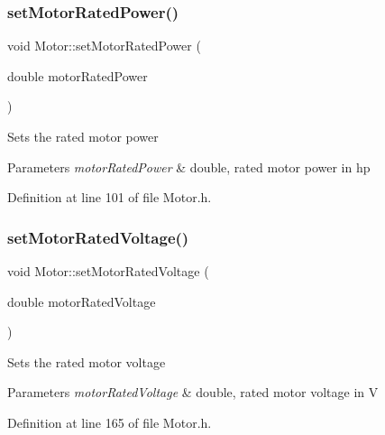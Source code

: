 \mbox{\label{class_motor_aa01f82db13c71b045b05e49f42ba46e9}} 
\subsubsection{\texorpdfstring{set\+Motor\+Rated\+Power()}{setMotorRatedPower()}}
{\footnotesize\ttfamily void Motor\+::set\+Motor\+Rated\+Power (\begin{DoxyParamCaption}\item[{double}]{motor\+Rated\+Power }\end{DoxyParamCaption})\hspace{0.3cm}{\ttfamily [inline]}}

Sets the rated motor power 
\begin{DoxyParams}{Parameters}
{\em motor\+Rated\+Power} & double, rated motor power in hp \\
\hline
\end{DoxyParams}


Definition at line 101 of file Motor.\+h.

\mbox{\label{class_motor_aab754019236e34cba0acd3632567515e}} 
\subsubsection{\texorpdfstring{set\+Motor\+Rated\+Voltage()}{setMotorRatedVoltage()}}
{\footnotesize\ttfamily void Motor\+::set\+Motor\+Rated\+Voltage (\begin{DoxyParamCaption}\item[{double}]{motor\+Rated\+Voltage }\end{DoxyParamCaption})\hspace{0.3cm}{\ttfamily [inline]}}

Sets the rated motor voltage 
\begin{DoxyParams}{Parameters}
{\em motor\+Rated\+Voltage} & double, rated motor voltage in V \\
\hline
\end{DoxyParams}


Definition at line 165 of file Motor.\+h.

\mbox{\label{class_motor_ac0fda674bd40e24bb864e8256fb5ba32}} 
